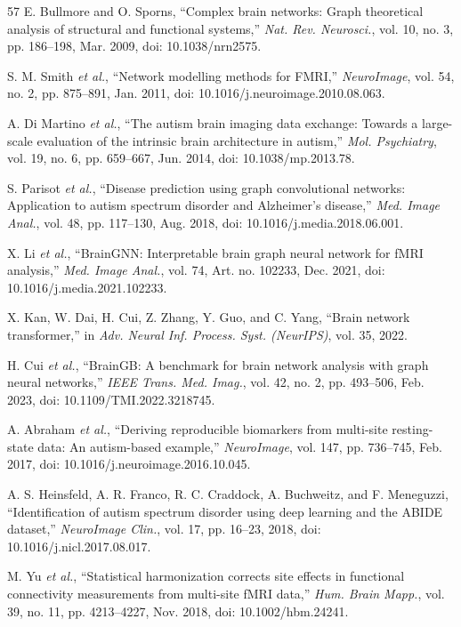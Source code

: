 \begin{thebibliography}{57}
E. Bullmore and O. Sporns, ``Complex brain networks: Graph theoretical analysis of structural and functional systems,'' \emph{Nat. Rev. Neurosci.}, vol. 10, no. 3, pp. 186--198, Mar. 2009, doi: 10.1038/nrn2575.

S. M. Smith \emph{et al.}, ``Network modelling methods for FMRI,'' \emph{NeuroImage}, vol. 54, no. 2, pp. 875--891, Jan. 2011, doi: 10.1016/j.neuroimage.2010.08.063.

A. Di Martino \emph{et al.}, ``The autism brain imaging data exchange: Towards a large-scale evaluation of the intrinsic brain architecture in autism,'' \emph{Mol. Psychiatry}, vol. 19, no. 6, pp. 659--667, Jun. 2014, doi: 10.1038/mp.2013.78.

S. Parisot \emph{et al.}, ``Disease prediction using graph convolutional networks: Application to autism spectrum disorder and Alzheimer's disease,'' \emph{Med. Image Anal.}, vol. 48, pp. 117--130, Aug. 2018, doi: 10.1016/j.media.2018.06.001.

X. Li \emph{et al.}, ``BrainGNN: Interpretable brain graph neural network for fMRI analysis,'' \emph{Med. Image Anal.}, vol. 74, Art. no. 102233, Dec. 2021, doi: 10.1016/j.media.2021.102233.

X. Kan, W. Dai, H. Cui, Z. Zhang, Y. Guo, and C. Yang, ``Brain network transformer,'' in \emph{Adv. Neural Inf. Process. Syst. (NeurIPS)}, vol. 35, 2022.

H. Cui \emph{et al.}, ``BrainGB: A benchmark for brain network analysis with graph neural networks,'' \emph{IEEE Trans. Med. Imag.}, vol. 42, no. 2, pp. 493--506, Feb. 2023, doi: 10.1109/TMI.2022.3218745.

A. Abraham \emph{et al.}, ``Deriving reproducible biomarkers from multi-site resting-state data: An autism-based example,'' \emph{NeuroImage}, vol. 147, pp. 736--745, Feb. 2017, doi: 10.1016/j.neuroimage.2016.10.045.

A. S. Heinsfeld, A. R. Franco, R. C. Craddock, A. Buchweitz, and F. Meneguzzi, ``Identification of autism spectrum disorder using deep learning and the ABIDE dataset,'' \emph{NeuroImage Clin.}, vol. 17, pp. 16--23, 2018, doi: 10.1016/j.nicl.2017.08.017.

M. Yu \emph{et al.}, ``Statistical harmonization corrects site effects in functional connectivity measurements from multi-site fMRI data,'' \emph{Hum. Brain Mapp.}, vol. 39, no. 11, pp. 4213--4227, Nov. 2018, doi: 10.1002/hbm.24241.


\end{thebibliography}
